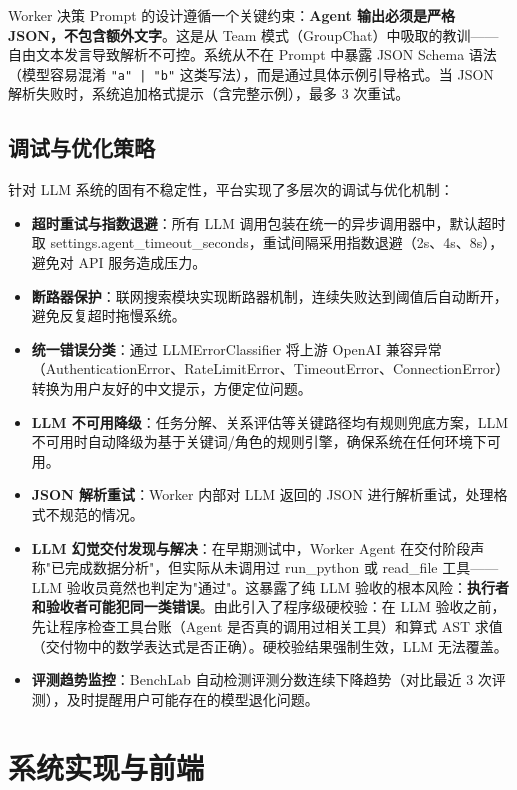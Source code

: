 \documentclass[12pt,a4paper]{article}%
\begin{document}
Worker 决策 Prompt 的设计遵循一个关键约束：\textbf{Agent 输出必须是严格 JSON，不包含额外文字}。这是从 Team 模式（GroupChat）中吸取的教训——自由文本发言导致解析不可控。系统从不在 Prompt 中暴露 JSON Schema 语法（模型容易混淆 \texttt{"a" | "b"} 这类写法），而是通过具体示例引导格式。当 JSON 解析失败时，系统追加格式提示（含完整示例），最多 3 次重试。

\subsection{调试与优化策略}

针对 LLM 系统的固有不稳定性，平台实现了多层次的调试与优化机制：

\begin{itemize}
	\item \textbf{超时重试与指数退避}：所有 LLM 调用包装在统一的异步调用器中，默认超时取 settings.agent\_timeout\_seconds，重试间隔采用指数退避（2s、4s、8s），避免对 API 服务造成压力。
	\item \textbf{断路器保护}：联网搜索模块实现断路器机制，连续失败达到阈值后自动断开，避免反复超时拖慢系统。
	\item \textbf{统一错误分类}：通过 LLMErrorClassifier 将上游 OpenAI 兼容异常（AuthenticationError、RateLimitError、TimeoutError、ConnectionError）转换为用户友好的中文提示，方便定位问题。
	\item \textbf{LLM 不可用降级}：任务分解、关系评估等关键路径均有规则兜底方案，LLM 不可用时自动降级为基于关键词/角色的规则引擎，确保系统在任何环境下可用。
	\item \textbf{JSON 解析重试}：Worker 内部对 LLM 返回的 JSON 进行解析重试，处理格式不规范的情况。
	\item \textbf{LLM 幻觉交付发现与解决}：在早期测试中，Worker Agent 在交付阶段声称"已完成数据分析"，但实际从未调用过 run\_python 或 read\_file 工具——LLM 验收员竟然也判定为"通过"。这暴露了纯 LLM 验收的根本风险：\textbf{执行者和验收者可能犯同一类错误}。由此引入了程序级硬校验：在 LLM 验收之前，先让程序检查工具台账（Agent 是否真的调用过相关工具）和算式 AST 求值（交付物中的数学表达式是否正确）。硬校验结果强制生效，LLM 无法覆盖。
	\item \textbf{评测趋势监控}：BenchLab 自动检测评测分数连续下降趋势（对比最近 3 次评测），及时提醒用户可能存在的模型退化问题。
\end{itemize}

\section{系统实现与前端}
\end{document}
